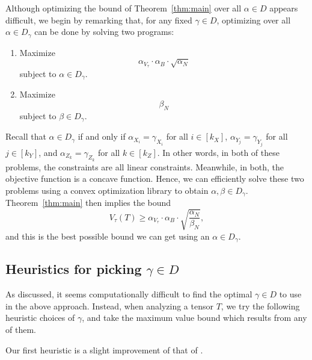 \documentclass{theoretics}
\begin{document}
Although optimizing the bound of Theorem~\ref{thm:main} over all $\alpha \in D$ appears difficult, we begin by remarking that, for any fixed $\gamma \in D$, optimizing over all $\alpha \in D_\gamma$ can be done by solving two programs:

\begin{enumerate}[label={\lsstyle\interextrabold\fontsize{12}{12}\selectfont PROBLEM \arabic*.},  align= left, itemsep=1em, labelindent = 0em,ref=\arabic*] 
    \item \label{prob1} Maximize $$\alpha_{V_\tau} \cdot \alpha_B \cdot \sqrt{\alpha_N}$$ subject to $\alpha \in D_\gamma$.
    \item \label{prob2} Maximize $$\beta_N$$ subject to $\beta \in D_\gamma$.
\end{enumerate}

 






Recall that $\alpha \in D_\gamma$ if and only if $\alpha_{X_i} = \gamma_{X_i}$ for all $i \in [k_X]$, $\alpha_{Y_j} = \gamma_{Y_j}$ for all $j \in [k_Y]$, and $\alpha_{Z_k} = \gamma_{Z_k}$ for all $k \in [k_Z]$. In other words, in both of these problems, the constraints are all linear constraints. Meanwhile, in both, the objective function is a concave function. Hence, we can efficiently solve these two problems using a convex optimization library to obtain $\alpha, \beta \in D_\gamma$. Theorem~\ref{thm:main} then implies the bound $$V_\tau(T) \geq \alpha_{V_\tau} \cdot \alpha_B \cdot \sqrt{\frac{\alpha_N}{\beta_N}},$$
and this is the best possible bound we can get using an $\alpha \in D_\gamma$.

\subsection{Heuristics for picking \texorpdfstring{$\gamma \in D$}{gamma in D}} \label{subsec:heuristics}

As discussed, it seems computationally difficult to find the optimal $\gamma \in D$ to use in the above approach. Instead, when analyzing a tensor $T$, we try the following heuristic choices of $\gamma$, and take the maximum value bound which results from any of them. 


Our first heuristic is a slight improvement of that of \cite[{Algorithm~B}]{legall}.
\end{document}
